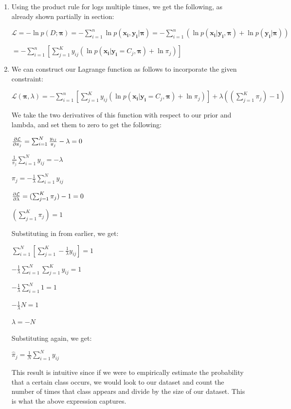 \documentclass[submit]{harvardml}
\begin{document}
\begin{enumerate}
    \item Using the product rule for logs multiple times, we get the following, as already shown partially in section:
    
    $\mathcal{L} = -\ln p(D; \boldsymbol{\pi}) = -\sum_{i=1}^n \ln p(\boldsymbol{x_i}, \boldsymbol{y_i}|\boldsymbol{\pi}) = -\sum_{i=1}^n (\ln p(\boldsymbol{x_i}|\boldsymbol{y_i}, \boldsymbol{\pi}) + \ln p(\boldsymbol{y_i}|\boldsymbol{\pi})) $
    
    $= -\sum_{i=1}^n [\sum_{j=1}^K y_{ij}(\ln p(\boldsymbol{x_i}|\boldsymbol{y_i} = C_j, \boldsymbol{\pi}) + \ln \pi_j)]$
    
    \item We can construct our Lagrange function as follows to incorporate the given constraint:
    
    $\mathcal{L(\boldsymbol{\pi}, \lambda)} = -\sum_{i=1}^n [\sum_{j=1}^K y_{ij}(\ln p(\boldsymbol{x_i}|\boldsymbol{y_i} = C_j, \boldsymbol{\pi}) + \ln \pi_j)] + \lambda((\sum_{j=1}^K \pi_j) - 1)$
    
    We take the two derivatives of this function with respect to our prior and lambda, and set them to zero to get the following:
    
    $\pdv{\mathcal{L}}{\pi_j} = \sum_{i=1}^N \frac{y_{ij}}{\pi_j} - \lambda = 0$
    
    $\frac{1}{\pi_j} \sum_{i=1}^N y_{ij} = -\lambda$
    
    $\pi_j = -\frac{1}{\lambda} \sum_{i=1}^N y_{ij}$
    
    $\pdv{\mathcal{L}}{\lambda} = (\sum_{j=1}^K \pi_j) - 1 = 0$
    
    $(\sum_{j=1}^K \pi_j) = 1$
    
    Substituting in from earlier, we get:
    
    $\sum_{i=1}^N[\sum_{j=1}^K -\frac{1}{\lambda} y_{ij}] = 1$
    
     $-\frac{1}{\lambda}\sum_{i=1}^N\sum_{j=1}^K  y_{ij} = 1$
     
     $-\frac{1}{\lambda}\sum_{i=1}^N 1 = 1$
     
     $-\frac{1}{\lambda}N = 1$
     
     $\lambda = -N$
     
     Substituting again, we get:
     
     $\hat{\pi}_j = \frac{1}{N} \sum_{i=1}^N y_{ij}$
     
     This result is intuitive since if we were to empirically estimate the probability that a certain class occurs, we would look to our dataset and count the number of times that class appears and divide by the size of our dataset. This is what the above expression captures.
     

\end{enumerate}
\end{document}
